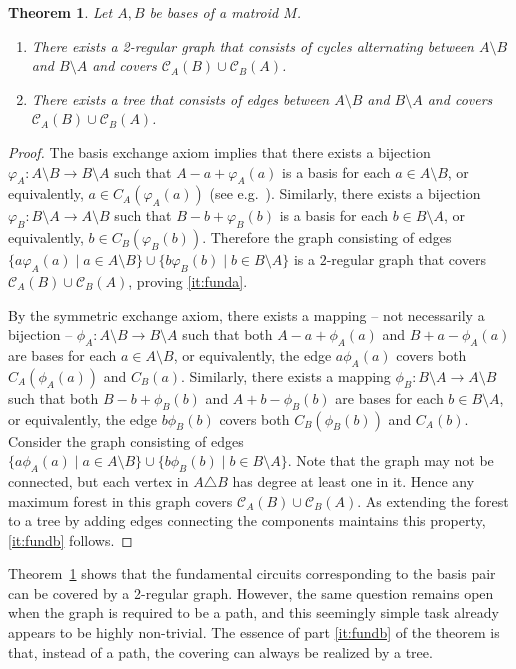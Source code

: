 \documentclass[11pt,a4paper]{article}
\theoremstyle{plain}
\newtheorem{thm}{Theorem}
\theoremstyle{definition}
\newcommand{\cC}{\mathcal{C}}
\begin{document}
\begin{thm} \label{thm:fundamenta}
Let $A,B$ be bases of a matroid $M$. 
\begin{enumerate}[label=(\alph*)]\itemsep0em
    \item\label{it:funda} There exists a 2-regular graph that consists of cycles alternating between $A\setminus B$ and $B \setminus A$ and covers $\cC_A(B)\cup\cC_B(A)$.
    \item\label{it:fundb} There exists a tree that consists of edges between $A\setminus B$ and $B\setminus A$ and covers $\cC_A(B)\cup \cC_B(A)$.
\end{enumerate}
\end{thm}
\begin{proof}
The basis exchange axiom implies that there exists a bijection $\varphi_A\colon A\setminus B\to B\setminus A$ such that $A-a+\varphi_A(a)$ is a basis for each $a\in A\setminus B$, or equivalently, $a\in C_A(\varphi_A(a))$ (see e.g.\ \cite[Theorem 5.3.4]{frank2011connections}).  Similarly, there exists a bijection $\varphi_B\colon B\setminus A\to A\setminus B$ such that $B-b+\varphi_B(b)$ is a basis for each $b\in B\setminus A$, or equivalently, $b\in C_B(\varphi_B(b))$. Therefore the graph consisting of edges $\{a\varphi_A(a)\mid a\in A\setminus B\}\cup\{b\varphi_B(b)\mid b\in B\setminus A\}$ is a $2$-regular graph that covers $\cC_A(B)\cup\cC_B(A)$, proving \ref{it:funda}.

By the symmetric exchange axiom, there exists a mapping -- not necessarily a bijection -- $\phi_A\colon A\setminus B\to B\setminus A$ such that both $A-a+\phi_A(a)$ and $B+a-\phi_A(a)$ are bases for each $a\in A\setminus B$, or equivalently, the edge $a\phi_A(a)$ covers both $C_A(\phi_A(a))$ and $C_B(a)$. Similarly, there exists a mapping $\phi_B\colon B\setminus A\to A\setminus B$ such that both $B-b+\phi_B(b)$ and $A+b-\phi_B(b)$ are bases for each $b\in B\setminus A$, or equivalently, the edge $b\phi_B(b)$ covers both $C_B(\phi_B(b))$ and $C_A(b)$. Consider the graph consisting of edges $\{a\phi_A(a)\mid a\in A\setminus B\}\cup\{b\phi_B(b)\mid b\in B\setminus A\}$. Note that the graph may not be connected, but each vertex in $A\triangle B$ has degree at least one in it. Hence any maximum forest in this graph covers $\cC_A(B)\cup\cC_B(A)$. As extending the forest to a tree by adding edges connecting the components maintains this property, \ref{it:fundb} follows.
\end{proof}

Theorem~\ref{thm:fundamenta} shows that the fundamental circuits corresponding to the basis pair can be covered by a 2-regular graph. However, the same question remains open when the graph is required to be a path, and this seemingly simple task already appears to be highly non-trivial. The essence of part \ref{it:fundb} of the theorem is that, instead of a path, the covering can always be realized by a tree.
\end{document}
